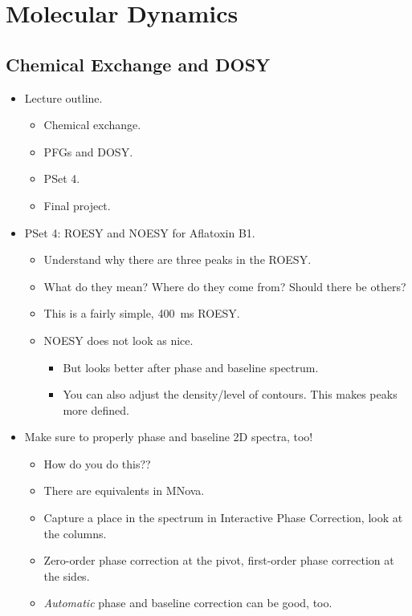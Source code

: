 \documentclass[../notes.tex]{subfiles}
\begin{document}
\chapter{Molecular Dynamics}
\section{Chemical Exchange and DOSY}
\begin{itemize}
    \item {}Lecture outline.
    \begin{itemize}
        \item Chemical exchange.
        \item PFGs and DOSY.
        \item PSet 4.
        \item Final project.
    \end{itemize}
    \item PSet 4: ROESY and NOESY for Aflatoxin B1.
    \begin{itemize}
        \item Understand why there are three peaks in the ROESY.
        \item What do they mean? Where do they come from? Should there be others?
        \item This is a fairly simple, \SI{400}{\milli\second} ROESY.
        \item NOESY does not look as nice.
        \begin{itemize}
            \item But looks better after phase and baseline spectrum.
            \item You can also adjust the density/level of contours. This makes peaks more defined.
        \end{itemize}
    \end{itemize}
    \item Make sure to properly phase and baseline 2D spectra, too!
    \begin{itemize}
        \item How do you do this??
        \item There are equivalents in MNova.
        \item Capture a place in the spectrum in Interactive Phase Correction, look at the columns.
        \item Zero-order phase correction at the pivot, first-order phase correction at the sides.
        \item \emph{Automatic} phase and baseline correction can be good, too.

\end{itemize}
\end{itemize}
\end{document}
